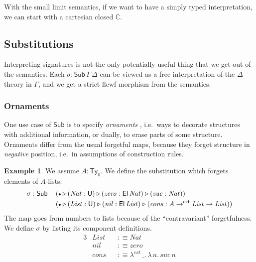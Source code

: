 \documentclass[12pt,a4paper,twoside,openany]{book}
\theoremstyle{remark}
\theoremstyle{definition}
\newtheorem{myexample}{Example}
\theoremstyle{theorem}
\newcommand{\mi}[1]{\mathit{#1}}
\newcommand{\ms}[1]{\mathsf{#1}}
\newcommand{\mbb}[1]{\mathbb{#1}}
\newcommand{\Sub}{\mathsf{Sub}}
\newcommand{\Ty}{\mathsf{Ty}}
\newcommand{\U}{\mathsf{U}}
\newcommand{\El}{\mathsf{El}}
\newcommand{\ext}{\triangleright}
\newcommand{\emptycon}{\scaleobj{.75}\bullet}
\newcommand{\toe}{\to^{\ms{ext}}}
\newcommand{\mbbC}{\mbb{C}}
\newcommand{\defn}{:\equiv}
\begin{document}
With the small limit semantics, if we want to have a simply typed
interpretation, we can start with a cartesian closed $\mbbC$.

\subsection{Substitutions}

Interpreting signatures is not the only potentially useful thing that we get out
of the semantics. Each $\sigma : \Sub\,\Gamma\,\Delta$ can be viewed as a free
interpretation of the $\Delta$ theory in $\Gamma$, and we get a strict flcwf
morphism from the semantics.

\subsubsection{Ornaments}

One use case of $\Sub$ is to specify \emph{ornaments} \cite{TODO}, i.e.\ ways
to decorate structures with additional information, or dually, to erase parts of
some structure. Ornaments differ from the usual forgetful maps, because they
forget structure in \emph{negative} position, i.e.\ in assumptions of
construction rules.

\begin{myexample}
We assume $A : \Ty_0$. We define the substitution which forgets elements of
$A$-lists.
\begin{alignat*}{3}
  & \sigma : \Sub\,&&
  (\emptycon \ext (\mi{Nat} : \U) \ext (\mi{zero} : \El\,\mi{Nat}) \ext (\mi{suc} : \mi{Nat}))\\
  & &&(\emptycon \ext (\mi{List} : \U) \ext (\mi{nil} : \El\,\mi{List}) \ext (\mi{cons} : A \toe \mi{List} \to \mi{List}))
\end{alignat*}
The map goes from numbers to lists because of the ``contravariant''
forgetfulness. We define $\sigma$ by listing its component definitions.
\begin{alignat*}{3}
  &\mi{List} &&\defn \mi{Nat}\\
  &\mi{nil} &&\defn \mi{zero}\\
  &\mi{cons} &&\defn \lambda^{ext}\,\_.\,\lambda\,n.\,\mi{suc}\,n
\end{alignat*}
\end{myexample}
\end{document}
